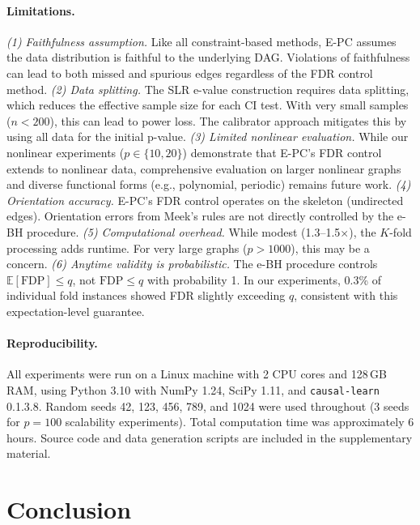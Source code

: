 \documentclass[11pt]{article}
\newcommand{\epc}{\textsc{E-PC}}
\newcommand{\E}{\mathbb{E}}
\begin{document}
\paragraph{Limitations.}
\textit{(1) Faithfulness assumption.} Like all constraint-based methods, \epc{} assumes the data distribution is faithful to the underlying DAG. Violations of faithfulness can lead to both missed and spurious edges regardless of the FDR control method.
\textit{(2) Data splitting.} The SLR e-value construction requires data splitting, which reduces the effective sample size for each CI test. With very small samples ($n < 200$), this can lead to power loss. The calibrator approach mitigates this by using all data for the initial p-value.
\textit{(3) Limited nonlinear evaluation.} While our nonlinear experiments ($p \in \{10, 20\}$) demonstrate that \epc{}'s FDR control extends to nonlinear data, comprehensive evaluation on larger nonlinear graphs and diverse functional forms (e.g., polynomial, periodic) remains future work.
\textit{(4) Orientation accuracy.} \epc{}'s FDR control operates on the skeleton (undirected edges). Orientation errors from Meek's rules are not directly controlled by the e-BH procedure.
\textit{(5) Computational overhead.} While modest (1.3--1.5$\times$), the $K$-fold processing adds runtime. For very large graphs ($p > 1000$), this may be a concern.
\textit{(6) Anytime validity is probabilistic.} The e-BH procedure controls $\E[\text{FDP}] \leq q$, not $\text{FDP} \leq q$ with probability 1. In our experiments, 0.3\% of individual fold instances showed FDR slightly exceeding $q$, consistent with this expectation-level guarantee.

\paragraph{Reproducibility.}
All experiments were run on a Linux machine with 2 CPU cores and 128\,GB RAM, using Python 3.10 with NumPy 1.24, SciPy 1.11, and \texttt{causal-learn} 0.1.3.8. Random seeds 42, 123, 456, 789, and 1024 were used throughout (3 seeds for $p = 100$ scalability experiments). Total computation time was approximately 6 hours. Source code and data generation scripts are included in the supplementary material.

\section{Conclusion}
\label{sec:conclusion}
\end{document}
